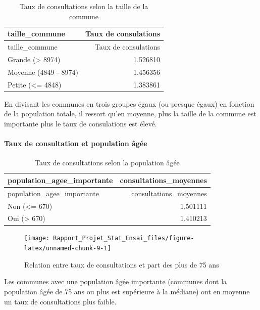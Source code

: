 \documentclass[
]{article}
\begin{document}
\begin{longtable}[]{@{}lr@{}}
\caption{Taux de consultations selon la taille de la
commune}\tabularnewline
\toprule\noalign{}
taille\_commune & Taux de consulations \\
\midrule\noalign{}
\endfirsthead
\toprule\noalign{}
taille\_commune & Taux de consulations \\
\midrule\noalign{}
\endhead
\bottomrule\noalign{}
\endlastfoot
Grande (\textgreater{} 8974) & 1.526810 \\
Moyenne (4849 - 8974) & 1.456356 \\
Petite (\textless= 4848) & 1.383861 \\
\end{longtable}

En divisant les communes en trois groupes égaux (ou presque égaux) en
fonction de la population totale, il ressort qu'en moyenne, plus la
taille de la commune est importante plus le taux de consulations est
élevé.

\paragraph{Taux de consultation et population
âgée}\label{taux-de-consultation-et-population-uxe2guxe9e}

\begin{longtable}[]{@{}lr@{}}
\caption{Taux de consultations selon la population âgée}\tabularnewline
\toprule\noalign{}
population\_agee\_importante & consultations\_moyennes \\
\midrule\noalign{}
\endfirsthead
\toprule\noalign{}
population\_agee\_importante & consultations\_moyennes \\
\midrule\noalign{}
\endhead
\bottomrule\noalign{}
\endlastfoot
Non (\textless= 670) & 1.501111 \\
Oui (\textgreater{} 670) & 1.410213 \\
\end{longtable}

\begin{figure}

{\centering \texttt{[image: Rapport\_Projet\_Stat\_Ensai\_files/figure-latex/unnamed-chunk-9-1]} 

}

\caption{Relation entre taux de consultations et part des plus de 75 ans}\label{fig:unnamed-chunk-9}
\end{figure}

Les communes avec une population âgée importante (communes dont la
population âgée de 75 ans ou plus est supérieure à la médiane) ont en
moyenne un taux de consultations plus faible.
\end{document}
